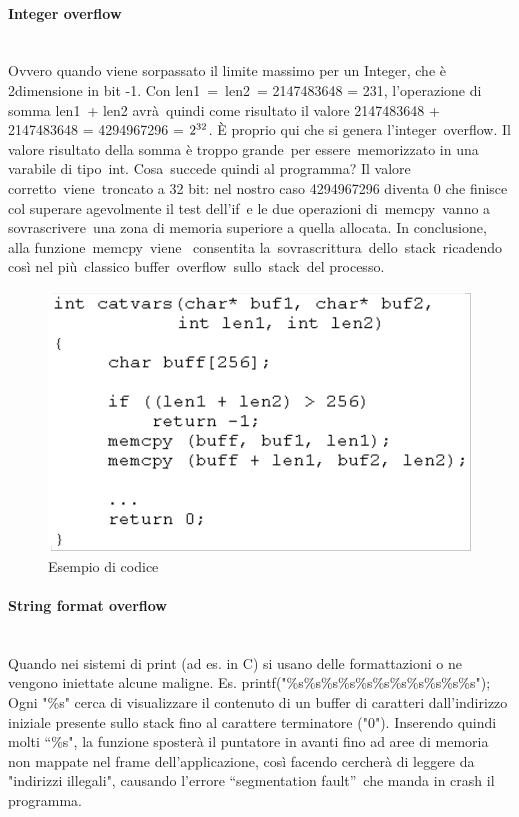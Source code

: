 \documentclass{article}
\begin{document}
\paragraph{Integer overflow}
\noindent
\\
Ovvero quando viene sorpassato il limite massimo per un Integer, che è 2dimensione in bit -1. 
Con len1 = len2 = 2147483648 = 231, l’operazione di somma len1 + len2 avrà quindi come risultato il 
valore 2147483648 + 2147483648 = 4294967296 = $2\textsuperscript{32}$. È proprio qui che si genera l’integer overflow. 
Il valore risultato della somma è troppo grande per essere memorizzato in una varabile di tipo int. 
Cosa succede quindi al programma? Il valore corretto viene troncato a 32 bit: nel nostro caso 4294967296 
diventa 0 che finisce col superare agevolmente il test dell’if e le due operazioni di memcpy vanno a 
sovrascrivere una zona di memoria superiore a quella allocata. In conclusione, alla funzione memcpy viene 
consentita la sovrascrittura dello stack ricadendo così nel più classico buffer overflow sullo stack del processo.
\begin{figure}[H]
    \center
    \includegraphics[scale=0.3]{images/BO3.png}
    \caption{Esempio di codice}\label{fig:1}
\end{figure}
\paragraph{String format overflow}
\noindent
\\
Quando nei sistemi di print (ad es. in C) si usano delle formattazioni o ne vengono iniettate alcune maligne. 
Es. printf("\%s\%s\%s\%s\%s\%s\%s\%s\%s\%s\%s"); Ogni "\%s" cerca di visualizzare il contenuto di un buffer di 
caratteri dall'indirizzo iniziale presente sullo stack fino al carattere terminatore ("0"). Inserendo quindi molti 
“\%s", la funzione sposterà il puntatore in avanti fino ad aree di memoria non mappate nel frame dell'applicazione, 
così facendo cercherà di leggere da "indirizzi illegali", causando l'errore “segmentation fault” che manda in 
crash il programma.
\end{document}
